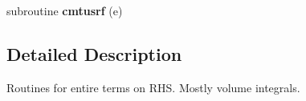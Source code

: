 \begin{DoxyCompactItemize}
\item 
\hypertarget{eqnsolver__cmt_8f_aa10e48ce3eda6377da8f35c3287fc72c}{subroutine {\bfseries cmtusrf} (e)}\label{eqnsolver__cmt_8f_aa10e48ce3eda6377da8f35c3287fc72c}

\end{DoxyCompactItemize}


\subsection{Detailed Description}
Routines for entire terms on R\-H\-S. Mostly volume integrals. 
